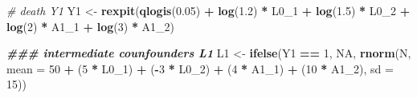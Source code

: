 \documentclass[
]{book}
\newenvironment{Shaded}{\begin{snugshade}}{\end{snugshade}}
\newcommand{\AttributeTok}[1]{\textcolor[rgb]{0.13,0.29,0.53}{#1}}
\newcommand{\CommentTok}[1]{\textcolor[rgb]{0.56,0.35,0.01}{\textit{#1}}}
\newcommand{\ConstantTok}[1]{\textcolor[rgb]{0.56,0.35,0.01}{#1}}
\newcommand{\DecValTok}[1]{\textcolor[rgb]{0.00,0.00,0.81}{#1}}
\newcommand{\DocumentationTok}[1]{\textcolor[rgb]{0.56,0.35,0.01}{\textbf{\textit{#1}}}}
\newcommand{\FloatTok}[1]{\textcolor[rgb]{0.00,0.00,0.81}{#1}}
\newcommand{\FunctionTok}[1]{\textcolor[rgb]{0.13,0.29,0.53}{\textbf{#1}}}
\newcommand{\NormalTok}[1]{#1}
\newcommand{\OtherTok}[1]{\textcolor[rgb]{0.56,0.35,0.01}{#1}}
\newcommand{\SpecialCharTok}[1]{\textcolor[rgb]{0.81,0.36,0.00}{\textbf{#1}}}
\begin{document}
\begin{Shaded}
\begin{Highlighting}[]
  \CommentTok{\# death Y1}
\NormalTok{  Y1 }\OtherTok{\textless{}{-}} \FunctionTok{rexpit}\NormalTok{(}\FunctionTok{qlogis}\NormalTok{(}\FloatTok{0.05}\NormalTok{) }\SpecialCharTok{+} \FunctionTok{log}\NormalTok{(}\FloatTok{1.2}\NormalTok{) }\SpecialCharTok{*}\NormalTok{ L0\_1  }\SpecialCharTok{+} \FunctionTok{log}\NormalTok{(}\FloatTok{1.5}\NormalTok{) }\SpecialCharTok{*}\NormalTok{ L0\_2 }\SpecialCharTok{+} 
                 \FunctionTok{log}\NormalTok{(}\DecValTok{2}\NormalTok{) }\SpecialCharTok{*}\NormalTok{ A1\_1 }\SpecialCharTok{+} \FunctionTok{log}\NormalTok{(}\DecValTok{3}\NormalTok{) }\SpecialCharTok{*}\NormalTok{ A1\_2)  }
  
  \DocumentationTok{\#\#\# intermediate counfounders L1}
\NormalTok{  L1 }\OtherTok{\textless{}{-}} \FunctionTok{ifelse}\NormalTok{(Y1 }\SpecialCharTok{==} \DecValTok{1}\NormalTok{,}
               \ConstantTok{NA}\NormalTok{,}
               \FunctionTok{rnorm}\NormalTok{(N, }\AttributeTok{mean =} \DecValTok{50} \SpecialCharTok{+}\NormalTok{ (}\DecValTok{5} \SpecialCharTok{*}\NormalTok{ L0\_1) }\SpecialCharTok{+} 
\NormalTok{                       (}\SpecialCharTok{{-}}\DecValTok{3} \SpecialCharTok{*}\NormalTok{ L0\_2) }\SpecialCharTok{+}\NormalTok{ (}\DecValTok{4} \SpecialCharTok{*}\NormalTok{ A1\_1) }\SpecialCharTok{+}\NormalTok{ (}\DecValTok{10} \SpecialCharTok{*}\NormalTok{ A1\_2),}
                     \AttributeTok{sd =} \DecValTok{15}\NormalTok{))}


\end{Highlighting}
\end{Shaded}
\end{document}

